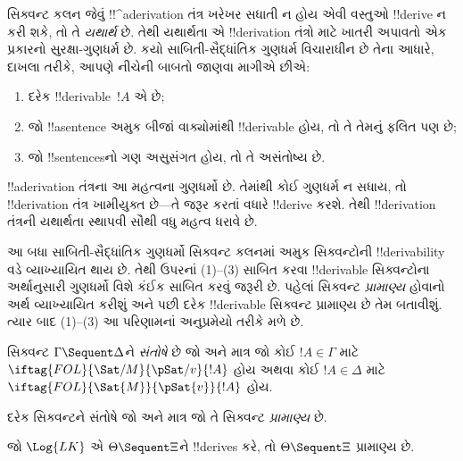 \documentclass[../../../include/open-logic-section]{subfiles}
\begin{document}
      {}
      {}


\begin{explain}
સિક્વન્ટ કલન જેવું !!^a{derivation} તંત્ર ખરેખર સધાતી ન હોય એવી વસ્તુઓ
!!{derive} ન કરી શકે, તો તે \emph{યથાર્થ} છે. તેથી યથાર્થતા એ
!!{derivation} તંત્રો માટે ખાતરી અપાવતો એક પ્રકારનો સુરક્ષા-ગુણધર્મ છે.
કયો સાબિતી-સૈદ્ધાંતિક ગુણધર્મ વિચારાધીન છે તેના આધારે, દાખલા તરીકે,
આપણે નીચેની બાબતો જાણવા માગીએ છીએ:
\begin{enumerate}
\item દરેક !!{derivable}~$!A$ એ  છે;
\item જો !!a{sentence} અમુક બીજાં વાક્યોમાંથી !!{derivable} હોય, તો તે
  તેમનું ફલિત પણ છે;
\item જો !!{sentence}sનો ગણ અસુસંગત હોય, તો તે અસંતોષ્ય છે.
\end{enumerate}
!!a{derivation} તંત્રના આ મહત્વના ગુણધર્મો છે. તેમાંથી કોઈ ગુણધર્મ ન
સધાય, તો !!{derivation} તંત્ર ખામીયુક્ત છે—તે જરૂર કરતાં વધારે
!!{derive} કરશે. તેથી !!{derivation} તંત્રની યથાર્થતા સ્થાપવી સૌથી વધુ
મહત્વ ધરાવે છે.

આ બધા સાબિતી-સૈદ્ધાંતિક ગુણધર્મો સિક્વન્ટ કલનમાં અમુક સિક્વન્ટોની
!!{derivability} વડે વ્યાખ્યાયિત થાય છે. તેથી ઉપરનાં (1)--(3) સાબિત કરવા
!!{derivable} સિક્વન્ટોના અર્થાનુસારી ગુણધર્મો વિશે કંઈક સાબિત કરવું
જરૂરી છે. પહેલાં સિક્વન્ટ \emph{પ્રામાણ્ય} હોવાનો અર્થ વ્યાખ્યાયિત કરીશું
અને પછી દરેક !!{derivable} સિક્વન્ટ પ્રામાણ્ય છે તેમ બતાવીશું. ત્યાર બાદ
(1)--(3) આ પરિણામનાં અનુપ્રમેયો તરીકે મળે છે.
\end{explain}

\begin{defn}
સિક્વન્ટ $\Gamma \Sequent \Delta$ને \emph{સંતોષે} છે જો અને માત્ર જો
કોઈ $!A \in \Gamma$ માટે
$\iftag{FOL}{\Sat/{M}}{\pSat/{v}}{!A}$ હોય અથવા કોઈ
$!A \in \Delta$ માટે $\iftag{FOL}{\Sat{M}}{\pSat{v}}{!A}$ હોય.

દરેક 
સિક્વન્ટને સંતોષે જો અને માત્ર જો તે સિક્વન્ટ \emph{પ્રામાણ્ય} છે.
\end{defn}

\begin{thm}[યથાર્થતા]
 જો $\Log{LK}$ એ
$\Theta \Sequent \Xi$ને !!{derive}s કરે, તો $\Theta \Sequent \Xi$
પ્રામાણ્ય છે.
\end{thm}
\end{document}
